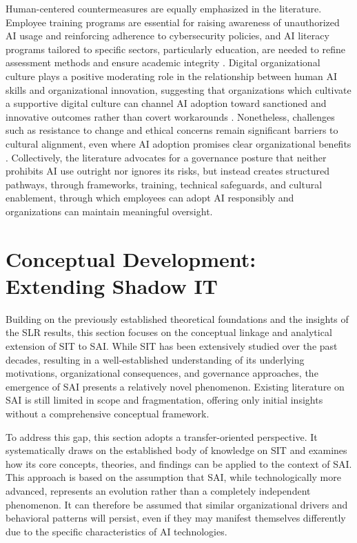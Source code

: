 \documentclass[12pt,oneside]{article}
\begin{document}
Human-centered countermeasures are equally emphasized in the literature. Employee training programs are essential for raising awareness of unauthorized \ac{AI} usage and reinforcing adherence to cybersecurity policies, and \ac{AI} literacy programs tailored to specific sectors, particularly education, are needed to refine assessment methods and ensure academic integrity \citep[6]{balogun2025ethical}. Digital organizational culture plays a positive moderating role in the relationship between human \ac{AI} skills and organizational innovation, suggesting that organizations which cultivate a supportive digital culture can channel \ac{AI} adoption toward sanctioned and innovative outcomes rather than covert workarounds \citep[1]{an2024impact}. Nonetheless, challenges such as resistance to change and ethical concerns remain significant barriers to cultural alignment, even where \ac{AI} adoption promises clear organizational benefits \citep[1]{murire2024artificial}. Collectively, the literature advocates for a governance posture that neither prohibits \ac{AI} use outright nor ignores its risks, but instead creates structured pathways, through frameworks, training, technical safeguards, and cultural enablement, through which employees can adopt \ac{AI} responsibly and organizations can maintain meaningful oversight.

\section{Conceptual Development: Extending Shadow IT} \label{conceptual-development}

Building on the previously established theoretical foundations and the insights of the \ac{SLR} results, this section focuses on the conceptual linkage and analytical extension of \ac{SIT} to \ac{SAI}. While \ac{SIT} has been extensively studied over the past decades, resulting in a well-established understanding of its underlying motivations, organizational consequences, and governance approaches, the emergence of \ac{SAI} presents a relatively novel phenomenon. Existing literature on \ac{SAI} is still limited in scope and fragmentation, offering only initial insights without a comprehensive conceptual framework.

To address this gap, this section adopts a transfer-oriented perspective. It systematically draws on the established body of knowledge on \ac{SIT} and examines how its core concepts, theories, and findings can be applied to the context of \ac{SAI}. This approach is based on the assumption that \ac{SAI}, while technologically more advanced, represents an evolution rather than a completely independent phenomenon. It can therefore be assumed that similar organizational drivers and behavioral patterns will persist, even if they may manifest themselves differently due to the specific characteristics of \ac{AI} technologies.
\end{document}
